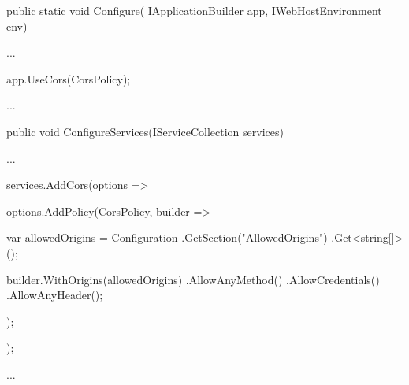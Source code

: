 \begin{spverbatim}
    public static void Configure(
    IApplicationBuilder app,
    IWebHostEnvironment env)
    {
        ...

        app.UseCors(CorsPolicy);

        ...
    }

    public void ConfigureServices(IServiceCollection services)
    {
        ...

        services.AddCors(options =>
        {
            options.AddPolicy(CorsPolicy, builder =>
            {
                var allowedOrigins = Configuration
                        .GetSection("AllowedOrigins")
                        .Get<string[]>();

                builder.WithOrigins(allowedOrigins)
                       .AllowAnyMethod()
                       .AllowCredentials()
                       .AllowAnyHeader();
            });
        });

        ...
    }
\end{spverbatim}